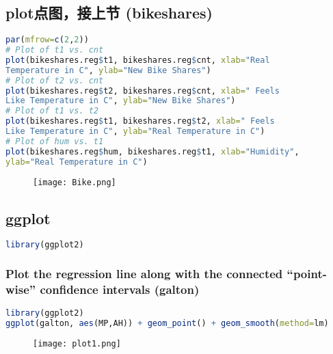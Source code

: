 \documentclass[11pt,a4paper]{article}
\begin{document}
\subsection{plot点图，接上节 (bikeshares)}
\begin{lstlisting}[language=R]
par(mfrow=c(2,2))
# Plot of t1 vs. cnt
plot(bikeshares.reg$t1, bikeshares.reg$cnt, xlab="Real
Temperature in C", ylab="New Bike Shares")
# Plot of t2 vs. cnt
plot(bikeshares.reg$t2, bikeshares.reg$cnt, xlab=" Feels
Like Temperature in C", ylab="New Bike Shares")
# Plot of t1 vs. t2
plot(bikeshares.reg$t1, bikeshares.reg$t2, xlab=" Feels
Like Temperature in C", ylab="Real Temperature in C")
# Plot of hum vs. t1
plot(bikeshares.reg$hum, bikeshares.reg$t1, xlab="Humidity",
ylab="Real Temperature in C")
\end{lstlisting}
\begin{center}\begin{figure}[htbp]
    \centering
    \texttt{[image: Bike.png]}
    \caption{}
    \label{}
\end{figure}\end{center}

\subsection{ggplot}
\begin{lstlisting}[language=R]
library(ggplot2)
\end{lstlisting}
\subsubsection{Plot the regression line along with the connected “point-wise” confidence intervals (galton)}
\begin{lstlisting}[language=R]
library(ggplot2)
ggplot(galton, aes(MP,AH)) + geom_point() + geom_smooth(method=lm)
\end{lstlisting}
\begin{center}\begin{figure}[htbp]
    \centering
    \texttt{[image: plot1.png]}
    \caption{}
    \label{}
\end{figure}\end{center}
\end{document}
